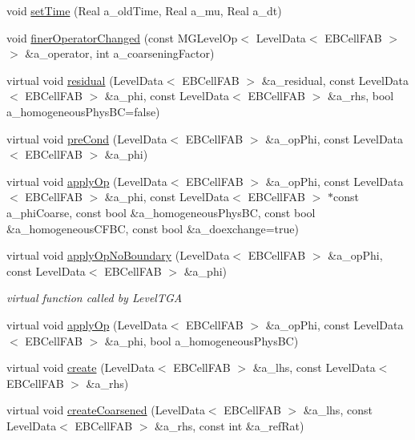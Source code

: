 \begin{DoxyCompactItemize}
\item 
void \hyperlink{classebconductivityop_abc260c0ae986109a6b2108e08ec3305c}{set\+Time} (Real a\+\_\+old\+Time, Real a\+\_\+mu, Real a\+\_\+dt)
\item 
void \hyperlink{classebconductivityop_a0a1bfc286af4f62a17355792bdc2fc69}{finer\+Operator\+Changed} (const M\+G\+Level\+Op$<$ Level\+Data$<$ E\+B\+Cell\+F\+AB $>$ $>$ \&a\+\_\+operator, int a\+\_\+coarsening\+Factor)
\item 
virtual void \hyperlink{classebconductivityop_a57dce866cd51952e21e3a6d4a9b2aeb5}{residual} (Level\+Data$<$ E\+B\+Cell\+F\+AB $>$ \&a\+\_\+residual, const Level\+Data$<$ E\+B\+Cell\+F\+AB $>$ \&a\+\_\+phi, const Level\+Data$<$ E\+B\+Cell\+F\+AB $>$ \&a\+\_\+rhs, bool a\+\_\+homogeneous\+Phys\+BC=false)
\item 
virtual void \hyperlink{classebconductivityop_ae1890fb0b8662e3b70dc11a7e2be4055}{pre\+Cond} (Level\+Data$<$ E\+B\+Cell\+F\+AB $>$ \&a\+\_\+op\+Phi, const Level\+Data$<$ E\+B\+Cell\+F\+AB $>$ \&a\+\_\+phi)
\item 
virtual void \hyperlink{classebconductivityop_a77dff68396c16e95df6f2033e2331fca}{apply\+Op} (Level\+Data$<$ E\+B\+Cell\+F\+AB $>$ \&a\+\_\+op\+Phi, const Level\+Data$<$ E\+B\+Cell\+F\+AB $>$ \&a\+\_\+phi, const Level\+Data$<$ E\+B\+Cell\+F\+AB $>$ $\ast$const a\+\_\+phi\+Coarse, const bool \&a\+\_\+homogeneous\+Phys\+BC, const bool \&a\+\_\+homogeneous\+C\+F\+BC, const bool \&a\+\_\+doexchange=true)
\item 
virtual void \hyperlink{classebconductivityop_ac329b46fe80747487ca2533733faab12}{apply\+Op\+No\+Boundary} (Level\+Data$<$ E\+B\+Cell\+F\+AB $>$ \&a\+\_\+op\+Phi, const Level\+Data$<$ E\+B\+Cell\+F\+AB $>$ \&a\+\_\+phi)
\begin{DoxyCompactList}\small\item\em virtual function called by Level\+T\+GA \end{DoxyCompactList}\item 
virtual void \hyperlink{classebconductivityop_a2d44c1292e46ca6691650055a2805560}{apply\+Op} (Level\+Data$<$ E\+B\+Cell\+F\+AB $>$ \&a\+\_\+op\+Phi, const Level\+Data$<$ E\+B\+Cell\+F\+AB $>$ \&a\+\_\+phi, bool a\+\_\+homogeneous\+Phys\+BC)
\item 
virtual void \hyperlink{classebconductivityop_a57011bebdbd679f5e1a0fc465ddc9d43}{create} (Level\+Data$<$ E\+B\+Cell\+F\+AB $>$ \&a\+\_\+lhs, const Level\+Data$<$ E\+B\+Cell\+F\+AB $>$ \&a\+\_\+rhs)
\item 
virtual void \hyperlink{classebconductivityop_a6a2d4d4598c29da304b5220475e753a5}{create\+Coarsened} (Level\+Data$<$ E\+B\+Cell\+F\+AB $>$ \&a\+\_\+lhs, const Level\+Data$<$ E\+B\+Cell\+F\+AB $>$ \&a\+\_\+rhs, const int \&a\+\_\+ref\+Rat)

\end{DoxyCompactItemize}
